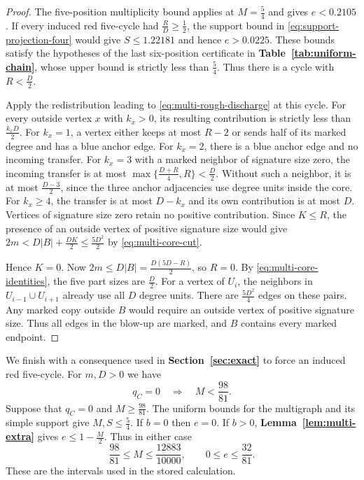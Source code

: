 \documentclass[preprint,11pt,numbers]{elsarticle-arxiv}
\numberwithin{equation}{section}
\theoremstyle{definition}
\begin{document}
\begin{proof}
The five-position multiplicity bound applies at $M=\frac{5}{4}$ and
gives $e<0.2105$. If every induced red five-cycle had
$\frac{R}{D}\ge\frac{1}{2}$, the support bound in \eqref{eq:support-projection-four} would give $S\le1.22181$ and
hence $e>0.0225$. These bounds satisfy the hypotheses of the last six-position certificate in \textbf{Table~\ref{tab:uniform-chain}}, whose upper bound is strictly less than
$\frac{5}{4}$. Thus there is a cycle with $R<\frac{D}{2}$.

Apply the redistribution leading to \eqref{eq:multi-rough-discharge}
at this cycle. For every outside vertex $x$ with $k_x>0$, its
resulting contribution is strictly less than $\frac{k_xD}{2}$.
For $k_x=1$, a vertex either keeps at most $R-2$ or sends half of
its marked degree and has a blue anchor edge. For $k_x=2$, there
is a blue anchor edge and no incoming transfer. For $k_x=3$ with
a marked neighbor of signature size zero, the incoming transfer
is at most $\max\{\frac{D+R}{4},R\}<\frac{D}{2}$. Without such a
neighbor, it is at most $\frac{D-3}{2}$, since the three anchor
adjacencies use degree units inside the core. For $k_x\ge4$,
the transfer is at most $D-k_x$ and its own contribution is
at most $D$. Vertices of signature size zero retain no positive
contribution. Since $K\le R$, the presence of an outside vertex
of positive signature size would give $2m<D|B|+\frac{DK}{2}
\le\frac{5D^2}{2}$ by \eqref{eq:multi-core-cut}.

Hence $K=0$. Now $2m\le D|B|=\frac{D(5D-R)}{2}$, so $R=0$.
By \eqref{eq:multi-core-identities}, the five part sizes are
$\frac{D}{2}$. For a vertex of $U_i$, the neighbors in
$U_{i-1}\cup U_{i+1}$ already use all $D$ degree units. There are
$\frac{5D^2}{4}$ edges on these pairs. Any marked copy outside
$B$ would require an outside vertex of positive signature size.
Thus all edges in the blow-up are marked, and $B$ contains every
marked endpoint.
\end{proof}


We finish with a consequence used in \textbf{Section~\ref{sec:exact}}
to force an induced red five-cycle. For $m,D>0$ we have
\begin{equation}\label{eq:absence-red-cycle}
 q_C=0 \quad\Longrightarrow\quad M<\frac{98}{81}.
\end{equation}
Suppose that $q_C=0$ and $M\geq\frac{98}{81}$. The uniform bounds for
the multigraph and its simple support give $M,S\leq\frac54$.
If $b=0$ then $e=0$. If $b>0$, \textbf{Lemma~\ref{lem:multi-extra}}
gives $e\leq1-\frac{M}{2}$. Thus in either case
\[
 \frac{98}{81}\leq M\leq\frac{12883}{10000},
 \qquad 0\leq e\leq\frac{32}{81}.
\]
These are the intervals used in the stored calculation.
\end{document}
